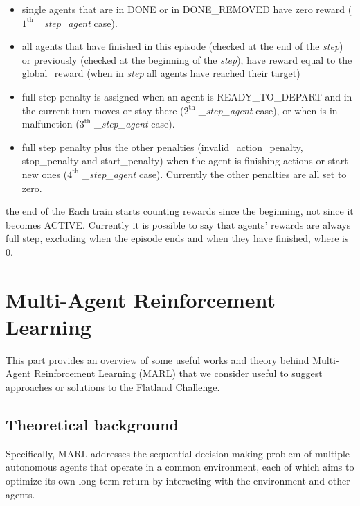 \documentclass[11pt, a4paper, hidelinks]{report}
\begin{document}
\begin{itemize}
	\item single agents that are in DONE or in DONE\_REMOVED have zero reward ($1^{\text{th}}$ \textit{\_step\_agent} case).
	\item all agents that have finished in this episode (checked at the end of the \textit{step}) or previously (checked at the beginning of the \textit{step}), have reward equal to the global\_reward (when in \textit{step} all agents have reached their target)
	\item full step penalty is assigned when an agent is READY\_TO\_DEPART and in the current turn moves or stay there ($2^{\text{th}}$ \textit{\_step\_agent} case), or when is in malfunction ($3^{\text{th}}$ \textit{\_step\_agent} case).
	\item full step penalty plus the other penalties (invalid\_action\_penalty, stop\_penalty and start\_penalty) when the agent is finishing actions or start new ones ($4^{\text{th}}$ \textit{\_step\_agent} case).
Currently the other penalties are all set to zero.
\end{itemize}
the end of the
Each train starts counting rewards since the beginning, not since it becomes ACTIVE\@.
Currently it is possible to say that agents' rewards are always full step, excluding when the episode ends and when they have finished, where is 0.

\chapter{Multi-Agent Reinforcement Learning}\label{ch:multi-agent-reinforcement-learning}

This part provides an overview of some useful works and theory behind Multi-Agent Reinforcement Learning (MARL) that we consider useful to suggest approaches or solutions to the Flatland Challenge.

\section{Theoretical background}\label{sec:marl-theoretical-background}

\begin{quoting}[font=itshape, begintext={"}, endtext={"\citep{MARL-definition}}]
Specifically, MARL addresses the sequential decision-making problem of multiple autonomous agents that operate in a common environment, each of which aims to optimize its own long-term return by interacting with the environment and other agents.
\end{quoting}
\end{document}
